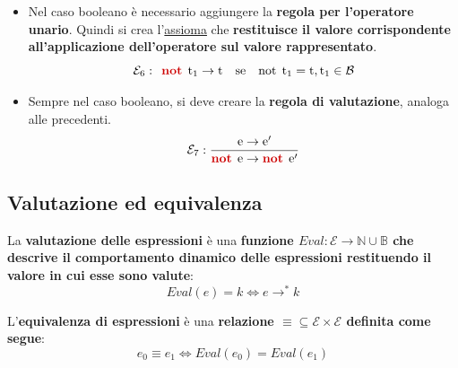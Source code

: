 \documentclass[a4paper]{article}
\begin{document}
\begin{itemize}
		\item Nel caso booleano è necessario aggiungere la \textbf{regola per l'operatore unario}. Quindi si crea l'\underline{assioma} che \textbf{restituisce il valore corrispondente all'applicazione dell'operatore sul valore rappresentato}.
		\begin{equation*}
			\mathcal{E}_{6} : \:\: \textcolor{Red3}{\mathbf{not}} \:\: \mathrm{t}_{1} \rightarrow \mathrm{t} \hspace{1em} \mathrm{se} \hspace{1em} \mathrm{not} \:\: \mathrm{t}_{1} = \mathrm{t}, \mathrm{t}_{1} \in \mathcal{B}
		\end{equation*}
		
		\item Sempre nel caso booleano, si deve creare la \textbf{regola di valutazione}, analoga alle precedenti.
		\begin{equation*}
			\mathcal{E}_{7} : \dfrac{
				\mathrm{e} \rightarrow \mathrm{e}'
			}{
				\textcolor{Red3}{\mathbf{not}} \:\: \mathrm{e} \rightarrow \textcolor{Red3}{\mathbf{not}} \:\: \mathrm{e}'
			}
		\end{equation*}
	\end{itemize}\newpage
	
	\subsection{Valutazione ed equivalenza}
	
	\begin{boxdef}
		La \textcolor{Red3}{\textbf{valutazione delle espressioni}} è una \textbf{funzione $Eval: \mathcal{E} \rightarrow \mathbb{N} \cup \mathbb{B}$ che descrive il comportamento dinamico delle espressioni restituendo il valore in cui esse sono valute}:
		\begin{equation*}
			Eval\left(e\right) = k \iff e \rightarrow^* k
		\end{equation*}
	\end{boxdef}\:\newline

	\begin{boxdef}
		L'\textcolor{Red3}{\textbf{equivalenza di espressioni}} è una \textbf{relazione $\equiv \subseteq \mathcal{E} \times \mathcal{E}$ definita come segue}:
		\begin{equation*}
			e_{0} \equiv e_{1} \iff Eval\left(e_{0}\right) = Eval\left(e_{1}\right)
		\end{equation*}
	\end{boxdef}\newpage
\end{document}
